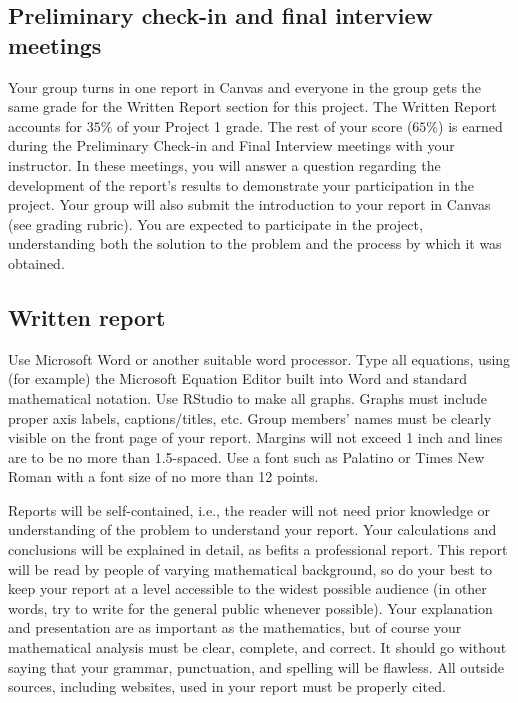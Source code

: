 \documentclass[11pt]{article}\usepackage[]{graphicx}\usepackage[]{color}
\begin{document}
\subsection*{Preliminary check-in and final interview meetings}

Your group turns in one report in Canvas and everyone in the group gets the
same grade for the Written Report section for this project. The Written Report
accounts for $35\%$ of your Project 1 grade.  The rest of your score ($65\%$)
is earned during the Preliminary Check-in and Final Interview meetings with
your instructor. In these meetings, you will answer a question regarding the
development of the report's results to demonstrate your participation in the
project. Your group will also submit the introduction to your report in Canvas
(see grading rubric). You are expected to participate in the project,
understanding both the solution to the problem and the process by which it was
obtained.

\subsection*{Written report}

Use Microsoft Word or another suitable word processor. Type all equations,
using (for example) the Microsoft Equation Editor built into Word and standard
mathematical notation. Use RStudio to make all graphs. Graphs must include
proper axis labels, captions/titles, etc. Group members' names must be clearly
visible on the front page of your report. Margins will not exceed 1 inch and
lines are to be no more than 1.5-spaced. Use a font such as Palatino or Times
New Roman with a font size of no more than 12 points.

Reports will be self-contained, i.e., the reader will not need prior knowledge
or understanding of the problem to understand your report. Your calculations
and conclusions will be explained in detail, as befits a professional report.
This report will be read by people of varying mathematical background, so do
your best to keep your report at a level accessible to the widest possible
audience (in other words, try to write for the general public whenever
possible). Your explanation and presentation are as important as the
mathematics, but of course your mathematical analysis must be clear, complete,
and correct. It should go without saying that your grammar, punctuation, and
spelling will be flawless. All outside sources, including websites, used in
your report must be properly cited.
\end{document}
